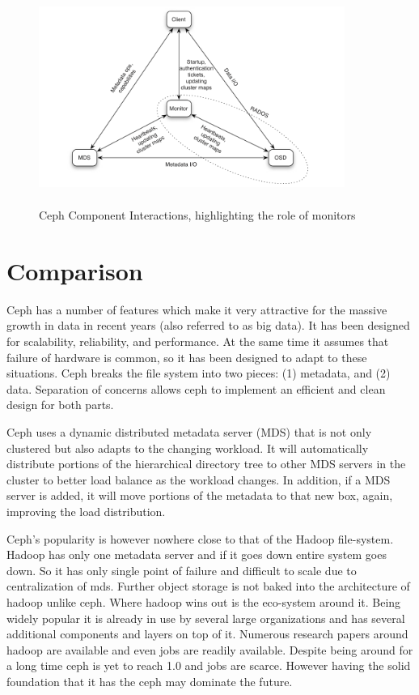 \documentclass[a4paper,10pt]{article}
\begin{document}
\begin{figure}[!htb]
\centering
\includegraphics[width=10cm,height=7cm]{images/cephinter}
\caption[Long caption]{Ceph Component Interactions, highlighting the role of monitors }
\end{figure}



\newpage
\section{Comparison}
    Ceph has a number of features which make it very attractive for the massive growth in data in recent years (also referred to as big data). It has been designed for scalability, reliability, and performance. At the same time it assumes that failure of hardware is common, so it has been designed to adapt to these situations. Ceph breaks the file system into two pieces: (1) metadata, and (2) data. Separation of concerns allows ceph to implement an efficient and clean design for both parts.\cite{lwn}

    Ceph uses a dynamic distributed metadata server (MDS) that is not only clustered but also adapts to the changing workload. It will automatically distribute portions of the hierarchical directory tree to other MDS servers in the cluster to better load balance as the workload changes. In addition, if a MDS server is added, it will move portions of the metadata to that new box, again, improving the load distribution.
    
    Ceph's popularity is however nowhere close to that of the Hadoop file-system. Hadoop has only one metadata server and if it goes down entire system goes down. So it has only single point of failure and difficult to scale due to centralization of mds. Further object storage is not baked into the architecture of hadoop unlike ceph. Where hadoop wins out is the eco-system around it. Being widely popular it is already in use by several large organizations and has several additional components and layers on top of it. Numerous research papers around hadoop are available and even jobs are readily available. Despite being around for a long time ceph is yet to reach 1.0 and jobs are scarce. However having the solid foundation that it has the ceph may dominate the future.
\end{document}
